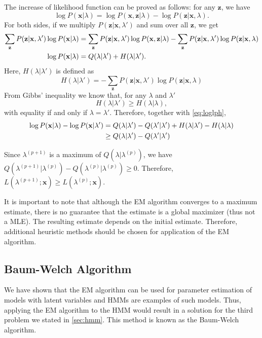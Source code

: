 \documentclass[12pt,final,twoside]{report}
\begin{document}
The increase of likelihood function can be proved as follows: for any $\mathbf{z}$, we have
\begin{equation}
  \log P(\mathbf{x}|\lambda) = \log P(\mathbf{x},\mathbf{z}|\lambda) - \log P(\mathbf{z}|\mathbf{x},\lambda). 
\end{equation}
For both sides, if we multiply $P(\mathbf{z}|\mathbf{x},\lambda')$ and sum over all $\mathbf{z}$, we get
\begin{align}
  \sum_{\mathbf{z}} P(\mathbf{z}|\mathbf{x},\lambda') \log P(\mathbf{x}|\lambda) 
  &= \sum_{\mathbf{z}} P(\mathbf{z}|\mathbf{x},\lambda') \log P(\mathbf{x},\mathbf{z}|\lambda)
  - \sum_{\mathbf{z}} P(\mathbf{z}|\mathbf{x},\lambda') \log P(\mathbf{z}|\mathbf{x},\lambda) \notag\\
  \log P(\mathbf{x}|\lambda) &= Q(\lambda|\lambda') + H(\lambda|\lambda')
  \label{eq:loglph}.
\end{align}
Here, $H(\lambda|\lambda')$ is defined as
\begin{equation}
  H(\lambda|\lambda') = - \sum_{\mathbf{z}} P(\mathbf{z}|\mathbf{x},\lambda') \log P(\mathbf{z}|\mathbf{x},\lambda)
\end{equation}
From Gibbs' inequality we know that, for any $\lambda$ and $\lambda'$
\begin{equation}
  H(\lambda|\lambda') \geq H(\lambda|\lambda),
\end{equation}
with equality if and only if $\lambda = \lambda'$. Therefore, together with \cref{eq:loglph},
\begin{align}
  \log P(\mathbf{x}|\lambda) - \log P(\mathbf{x}|\lambda') &= Q(\lambda|\lambda') - Q(\lambda'|\lambda') + H(\lambda|\lambda') -  H(\lambda|\lambda) \notag\\
  & \geq Q(\lambda|\lambda') - Q(\lambda'|\lambda')
\end{align}

Since $\lambda^{(p+1)}$ is a maximum of $Q(\lambda|\lambda^{(p)})$, we have $Q(\lambda^{(p+1)}|\lambda^{(p)}) - Q(\lambda^{(p)}|\lambda^{(p)}) \geq 0$. Therefore, $L(\lambda^{(p+1)};\mathbf{x}) \geq L(\lambda^{(p)};\mathbf{x})$.

It is important to note that although the EM algorithm converges to a maximum estimate, there is no guarantee that the estimate is a global maximizer (thus not a MLE). The resulting estimate depends on the initial estimate. Therefore, additional heuristic methods should be chosen for application of the EM algorithm.

\subsection{Baum-Welch Algorithm}
We have shown that the EM algorithm can be used for parameter estimation of models with latent variables and HMMs are examples of such models. Thus, applying the EM algorithm to the HMM would result in a solution for the third problem we stated in \cref{sec:hmm}. This method is known as the Baum-Welch algorithm.
\end{document}
